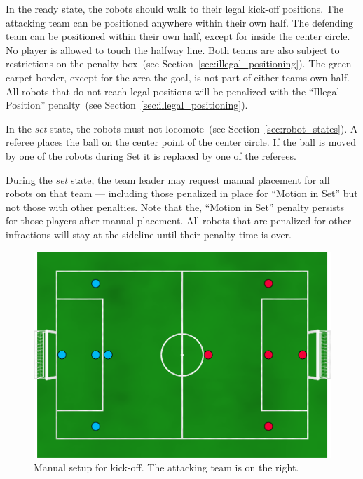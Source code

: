 \documentclass[12pt]{article}
\newcommand{\cf}{see\xspace}
\begin{document}
In the ready state, the robots should walk to their legal kick-off positions. 
The attacking team can be positioned anywhere within their own half.
The defending team can be positioned within their own half, except for inside the center circle.
No player is allowed to touch the halfway line.
Both teams are also subject to restrictions on the penalty box~(\cf Section~\ref{sec:illegal_positioning}).
The green carpet border, except for the area the goal, is not part of either teams own half. All robots that do not reach legal positions will be penalized with the ``Illegal Position'' penalty~(\cf Section~\ref{sec:illegal_positioning}).


In the \emph{set} state, the robots must not locomote~(\cf Section~\ref{sec:robot_states}). A referee places the ball on the center point of the center circle. If the ball is moved by one of the robots during Set it is replaced by one of the referees.

During the \textit{set} state, the team leader may request manual placement for all robots on that team --- including those penalized in place for ``Motion in Set'' but not those with other penalties.
Note that the, ``Motion in Set'' penalty persists for those players after manual placement. All robots that are penalized for other infractions will stay at the sideline until their penalty time is over.

\begin{figure}[t]
\centerline{\includegraphics[width=\columnwidth]{figs/manual-placement-2020.png}}
\caption{Manual setup for kick-off.  The attacking team is on the right.}
\label{fig:ko}
\end{figure}
\end{document}
